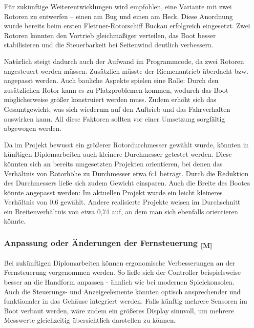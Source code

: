 \documentclass[a4paper,12pt]{article}
\begin{document}
Für zukünftige Weiterentwicklungen wird empfohlen, eine Variante mit zwei Rotoren zu entwerfen – einen am Bug und einen am Heck. Diese Anordnung wurde bereits beim ersten Flettner-Rotorschiff Buckau erfolgreich eingesetzt. Zwei Rotoren könnten den Vortrieb gleichmäßiger verteilen, das Boot besser stabilisieren und die Steuerbarkeit bei Seitenwind deutlich verbessern.\cite{dewiki:225382730}\newline

Natürlich steigt dadurch auch der Aufwand im Programmcode, da zwei Rotoren angesteuert werden müssen. Zusätzlich müsste der Riemenantrieb überdacht bzw. angepasst werden. Auch bauliche Aspekte spielen eine Rolle: Durch den zusätzlichen Rotor kann es zu Platzproblemen kommen, wodurch das Boot möglicherweise größer konstruiert werden muss. Zudem erhöht sich das Gesamtgewicht, was sich wiederum auf den Auftrieb und das Fahrverhalten auswirken kann. All diese Faktoren sollten vor einer Umsetzung sorgfältig abgewogen werden.\newline

Da im Projekt bewusst ein größerer Rotordurchmesser gewählt wurde, könnten in künftigen Diplomarbeiten auch kleinere Durchmesser getestet werden. Diese könnten sich an bereits umgesetzten Projekten orientieren, bei denen das Verhältnis von Rotorhöhe zu Durchmesser etwa 6:1 beträgt. Durch die Reduktion des Durchmessers ließe sich zudem Gewicht einsparen. Auch die Breite des Bootes könnte angepasst werden: Im aktuellen Projekt wurde ein leicht kleineres Verhältnis von 0,6 gewählt. Andere realisierte Projekte weisen im Durchschnitt ein Breitenverhältnis von etwa 0,74 auf, an dem man sich ebenfalls orientieren könnte.

\subsubsection{\texorpdfstring{Anpassung oder Änderungen der Fernsteuerung \textsubscript{[M]}}{Anpassung oder Änderungen der Fernsteuerung [M]}}

Bei zukünftigen Diplomarbeiten können ergonomische Verbesserungen an der Fernsteuerung vorgenommen werden. So ließe sich der Controller beispielsweise besser an die Handform anpassen - ähnlich wie bei modernen Spielekonsolen. Auch die Steuerungs- und Anzeigeelemente könnten optisch ansprechender und funktionaler in das Gehäuse integriert werden. Falls künftig mehrere Sensoren im Boot verbaut werden, wäre zudem ein größeres Display sinnvoll, um mehrere Messwerte gleichzeitig übersichtlich darstellen zu können.
\end{document}
